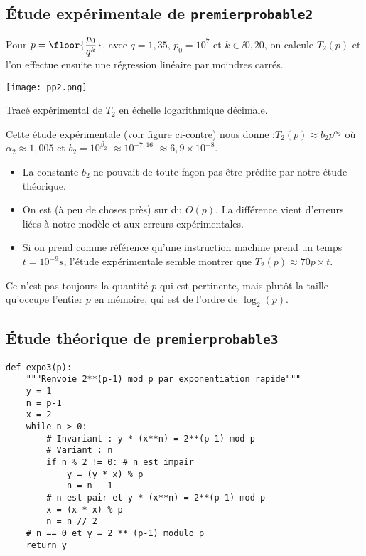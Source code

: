 \subsection{Étude expérimentale de \lstinline{premierprobable2}}
Pour $p = \floor{\dfrac{p_0}{q^k}}$, avec $q = 1,35$, $p_0 = 10^7$ et $k\in\ii{0,20}$, on calcule $T_2(p)$ et l'on effectue ensuite une régression linéaire par moindres carrés.





  \begin{marginfigure}
    \texttt{[image: pp2.png]}
    \caption{Tracé expérimental de $T_2$ en échelle logarithmique décimale.}
    \label{fig.pp2}
 \end{marginfigure}

Cette étude expérimentale (voir figure ci-contre)%
  nous donne :$ T_{2}(p)\approx b_{2} p^{\alpha_{2}}$ où $\alpha_{2}\approx 1,005$ 
   et $b_{2} = 10^{\beta_{2}}$ $\approx 10^{-7,16}$ $\approx 6,9\times 10^{-8}$.

\begin{itemize}
\item La constante $b_{2}$ ne pouvait de toute façon pas être prédite
  par notre étude théorique.
\item On est (à peu de choses près) sur du $O(p)$. La différence vient
  d'erreurs liées à notre modèle et aux erreurs expérimentales.
\item Si on prend comme référence qu'une instruction machine prend
  un temps $t = 10^{-9}s$, l'étude expérimentale semble montrer que
  $T_{2}(p)\approx 70 p \times t$.
\end{itemize}


\begin{remarque}
  Ce n'est pas toujours la quantité $p$ qui est pertinente, mais plutôt la taille qu'occupe l'entier $p$ en mémoire, qui est de l'ordre de $\log_2(p)$.
\end{remarque}


\subsection{Étude théorique de \lstinline{premierprobable3}}

\begin{lstlisting}
def expo3(p):     
    """Renvoie 2**(p-1) mod p par exponentiation rapide"""
    y = 1
    n = p-1
    x = 2
    while n > 0:
        # Invariant : y * (x**n) = 2**(p-1) mod p
        # Variant : n
        if n % 2 != 0: # n est impair
            y = (y * x) % p
            n = n - 1
        # n est pair et y * (x**n) = 2**(p-1) mod p
        x = (x * x) % p
        n = n // 2
    # n == 0 et y = 2 ** (p-1) modulo p
    return y
\end{lstlisting}

